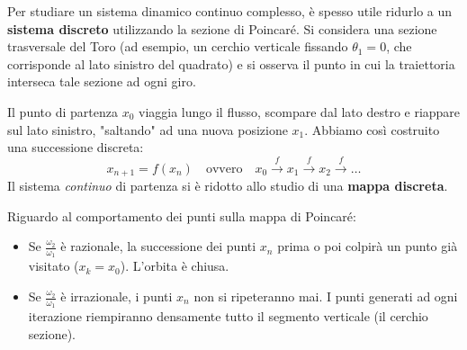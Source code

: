 \documentclass[openany]{book}
\theoremstyle{definition}
\theoremstyle{remark}
\begin{document}
Per studiare un sistema dinamico continuo complesso, è spesso utile ridurlo a un \textbf{sistema discreto} utilizzando la sezione di Poincaré. 
Si considera una sezione trasversale del Toro (ad esempio, un cerchio verticale fissando $\theta_1 = 0$, che corrisponde al lato sinistro del quadrato) e si osserva il punto in cui la traiettoria interseca tale sezione ad ogni giro.

\begin{center}
\end{center}

Il punto di partenza $x_0$ viaggia lungo il flusso, scompare dal lato destro e riappare sul lato sinistro, "saltando" ad una nuova posizione $x_1$.
Abbiamo così costruito una successione discreta:
\begin{equation}
    x_{n+1} = f(x_n) \quad \text{ovvero} \quad x_0 \xrightarrow{f} x_1 \xrightarrow{f} x_2 \xrightarrow{f} \dots
\end{equation}
Il sistema \textit{continuo} di partenza si è ridotto allo studio di una \textbf{mappa discreta}.

Riguardo al comportamento dei punti sulla mappa di Poincaré:
\begin{itemize}
    \item Se $\frac{\omega_2}{\omega_1}$ è razionale, la successione dei punti $x_n$ prima o poi colpirà un punto già visitato ($x_k = x_0$). L'orbita è chiusa.
    \item Se $\frac{\omega_2}{\omega_1}$ è irrazionale, i punti $x_n$ non si ripeteranno mai. I punti generati ad ogni iterazione riempiranno densamente tutto il segmento verticale (il cerchio sezione).
\end{itemize}
\end{document}
